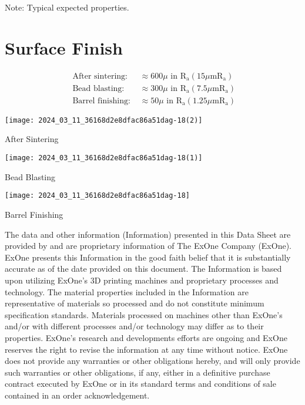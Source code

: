 \documentclass[10pt]{article}
\begin{document}
Note: Typical expected properties.

\section*{Surface Finish}
$$
\begin{array}{ll}
\text { After sintering: } & \approx 600 \mu \text { in } \mathrm{R}_{\mathrm{a}}\left(15 \mu \mathrm{m} \mathrm{R}_{\mathrm{a}}\right) \\
\text { Bead blasting: } & \approx 300 \mu \text { in } \mathrm{R}_{\mathrm{a}}\left(7.5 \mu \mathrm{m} \mathrm{R}_{\mathrm{a}}\right) \\
\text { Barrel finishing: } & \approx 50 \mu \text { in } \mathrm{R}_{\mathrm{a}}\left(1.25 \mu \mathrm{m} \mathrm{R}_{\mathrm{a}}\right)
\end{array}
$$

\begin{center}
\texttt{[image: 2024\_03\_11\_36168d2e8dfac86a51dag-18(2)]}
\end{center}

After Sintering

\begin{center}
\texttt{[image: 2024\_03\_11\_36168d2e8dfac86a51dag-18(1)]}
\end{center}

Bead Blasting

\begin{center}
\texttt{[image: 2024\_03\_11\_36168d2e8dfac86a51dag-18]}
\end{center}

Barrel Finishing

The data and other information (Information) presented in this Data Sheet are provided by and are proprietary information of The ExOne Company (ExOne). ExOne presents this Information in the good faith belief that it is substantially accurate as of the date provided on this document. The Information is based upon utilizing ExOne's 3D printing machines and proprietary processes and technology. The material properties included in the Information are representative of materials so processed and do not constitute minimum specification standards. Materials processed on machines other than ExOne's and/or with different processes and/or technology may differ as to their properties. ExOne's research and developments efforts are ongoing and ExOne reserves the right to revise the information at any time without notice. ExOne does not provide any warranties or other obligations hereby, and will only provide such warranties or other obligations, if any, either in a definitive purchase contract executed by ExOne or in its standard terms and conditions of sale contained in an order acknowledgement.
\end{document}
